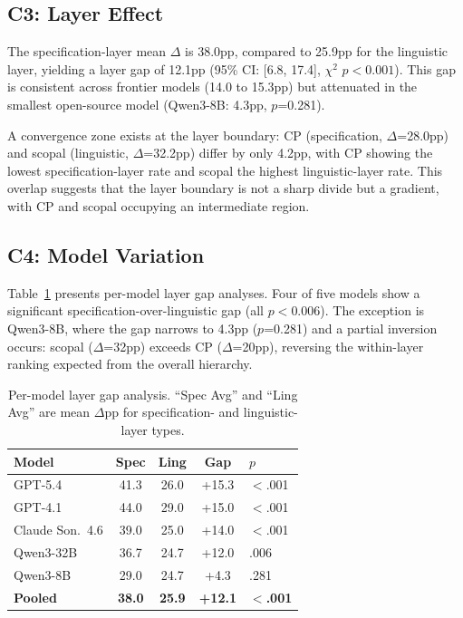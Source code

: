 \documentclass[11pt]{article}
\begin{document}
\subsection{C3: Layer Effect}
\label{sec:layer}

The specification-layer mean $\Delta$ is 38.0pp, compared to 25.9pp for the linguistic layer, yielding a layer gap of 12.1pp (95\% CI: [6.8, 17.4], $\chi^2$ $p<0.001$). This gap is consistent across frontier models (14.0 to 15.3pp) but attenuated in the smallest open-source model (Qwen3-8B: 4.3pp, $p$=0.281).

A convergence zone exists at the layer boundary: CP (specification, $\Delta$=28.0pp) and scopal (linguistic, $\Delta$=32.2pp) differ by only 4.2pp, with CP showing the lowest specification-layer rate and scopal the highest linguistic-layer rate. This overlap suggests that the layer boundary is not a sharp divide but a gradient, with CP and scopal occupying an intermediate region.

\subsection{C4: Model Variation}
\label{sec:model_variation}

Table~\ref{tab:model_layer} presents per-model layer gap analyses. Four of five models show a significant specification-over-linguistic gap (all $p<0.006$). The exception is Qwen3-8B, where the gap narrows to 4.3pp ($p$=0.281) and a partial inversion occurs: scopal ($\Delta$=32pp) exceeds CP ($\Delta$=20pp), reversing the within-layer ranking expected from the overall hierarchy.

\begin{table}[t]
\centering
\small
\caption{Per-model layer gap analysis. ``Spec Avg'' and ``Ling Avg'' are mean $\Delta$pp for specification- and linguistic-layer types.}
\label{tab:model_layer}
\begin{tabular}{lcccl}
\toprule
\textbf{Model} & \textbf{Spec} & \textbf{Ling} & \textbf{Gap} & \textbf{$p$} \\
\midrule
GPT-5.4 & 41.3 & 26.0 & +15.3 & $<$.001 \\
GPT-4.1 & 44.0 & 29.0 & +15.0 & $<$.001 \\
Claude Son.\ 4.6 & 39.0 & 25.0 & +14.0 & $<$.001 \\
Qwen3-32B & 36.7 & 24.7 & +12.0 & .006 \\
Qwen3-8B & 29.0 & 24.7 & +4.3 & .281 \\
\midrule
\textbf{Pooled} & \textbf{38.0} & \textbf{25.9} & \textbf{+12.1} & $<$\textbf{.001} \\
\bottomrule
\end{tabular}
\end{table}
\end{document}
